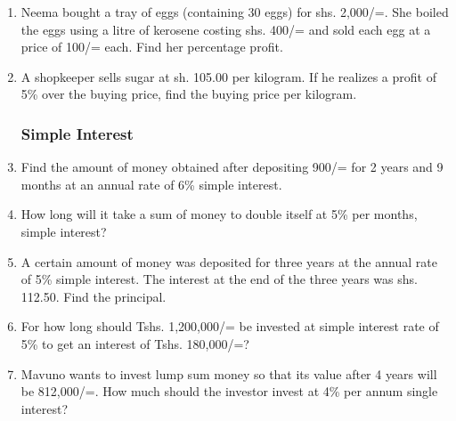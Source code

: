 \begin{enumerate}
	\item Neema bought a tray of eggs (containing 30 eggs) for shs. 2,000/=. She boiled the eggs using a litre of kerosene costing shs. 400/= and sold each egg at a price of 100/= each. Find her percentage profit.
	
	\item A shopkeeper sells sugar at sh. 105.00 per kilogram. If he realizes a profit of 5\% over the buying price, find the buying price per kilogram.
	
	
		\subsubsection{Simple Interest}
	\item Find the amount of money obtained after depositing 900/= for 2 years and 9 months at an annual rate of 6\% simple interest.
	
	\item How long will it take a sum of money to double itself at 5\% per months, simple interest?
	
	\item A certain amount of money was deposited for three years at the annual rate of 5\% simple interest. The interest at the end of the three years was shs. 112.50. Find the principal.
	
	\item For how long should Tshs. 1,200,000/= be invested at simple interest rate of 5\% to get an interest of Tshs. 180,000/=?
	
	\item Mavuno wants to invest lump sum money so that its value after 4 years will be 812,000/=. How much should the investor invest at 4\% per annum single interest?

\end{enumerate}
